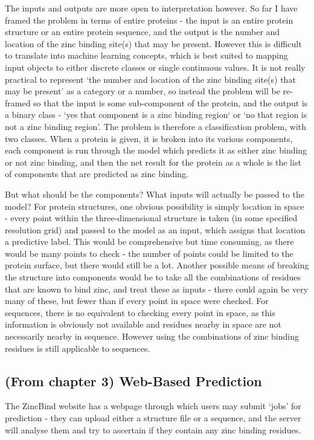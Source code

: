 The inputs and outputs are more open to interpretation however. So far I have framed the problem in terms of entire proteins - the input is an entire protein structure or an entire protein sequence, and the output is the number and location of the zinc binding site(s) that may be present. However this is difficult to translate into machine learning concepts, which is best suited to mapping input objects to either discrete classes or single continuous values. It is not really practical to represent `the number and location of the zinc binding site(s) that may be present' as a category or a number, so instead the problem will be re-framed so that the input is some sub-component of the protein, and the output is a binary class - `yes that component is a zinc binding region` or `no that region is not a zinc binding region'. The problem is therefore a classification problem, with two classes. When a protein is given, it is broken into its various components, each component is run through the model which predicts it as either zinc binding or not zinc binding, and then the net result for the protein as a whole is the list of components that are predicted as zinc binding.

But what should be the components? What inputs will actually be passed to the model? For protein structures, one obvious possibility is simply location in space - every point within the three-dimensional structure is taken (in some specified resolution grid) and passed to the model as an input, which assigns that location a predictive label. This would be comprehensive but time consuming, as there would be many points to check - the number of points could be limited to the protein surface, but there would still be a lot. Another possible means of breaking the structure into components would be to take all the combinations of residues that are known to bind zinc, and treat these as inputs - there could again be very many of these, but fewer than if every point in space were checked. For sequences, there is no equivalent to checking every point in space, as this information is obviously not available and residues nearby in space are not necessarily nearby in sequence. However using the combinations of zinc binding residues is still applicable to sequences.


\subsection{(From chapter 3) Web-Based Prediction}

The ZincBind website has a webpage through which users may submit `jobs' for prediction - they can upload either a structure file or a sequence, and the server will analyse them and try to ascertain if they contain any zinc binding residues.

